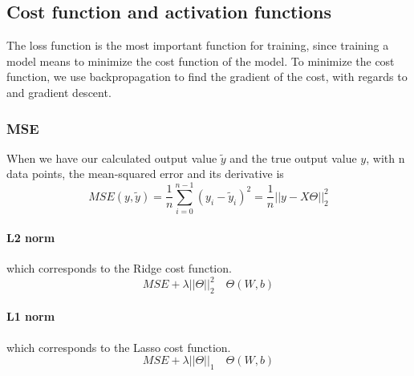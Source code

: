 \subsection{Cost function and activation functions}
\label{sec:theory-Cost}
The loss function is the most important function 
for training, since training a model
means to minimize the cost function of the model.  
To minimize the cost function, we use backpropagation
to find the gradient of the cost, with regards
to  and gradient descent.

\subsubsection{MSE}
When we have our calculated output value $\tilde{y}$ and the true
output value $y$, with n data points, the mean-squared error and its derivative is
\begin{equation}
    MSE(y,\tilde{y}) = \frac{1}{n}\sum_{i=0}^{n-1}(y_i - \tilde{y}_i)^2 =
    \frac{1}{n}||y - X\Theta||_2^2
    \label{eq:MSE}
\end{equation}
\paragraph{L2 norm} which corresponds to the Ridge cost function.
\begin{equation}
    MSE + \lambda||\Theta||_2^2 \quad \Theta(W, b)
    \label{eq:RidgeCost}
\end{equation}
\paragraph{L1 norm} which corresponds to the Lasso cost function.
\begin{equation}
    MSE + \lambda||\Theta||_1 \quad \Theta(W, b)
    \label{eq:LassoCost}
\end{equation}
\cite[p.~86-91]{LectureNotes}

